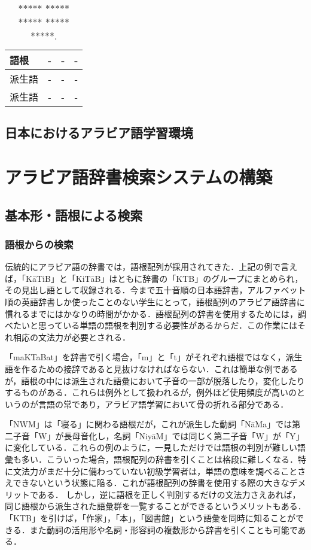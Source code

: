 \documentclass[technicalreport]{ieicej}
\begin{document}
\begin{table}[ht]
\begin{center}
\begin{tabular}{l|ccc}
   語根& - & -& -\\
  \hline
 派生語& - & -& -\\
  派生語 & - & - & -\\
\hline
\end{tabular}
\caption{***** ***** ***** ***** *****.}
\label{table:alignment}
\end{center}
\end{table}


\subsection{日本におけるアラビア語学習環境}

\section{アラビア語辞書検索システムの構築}
\subsection{基本形・語根による検索}
\subsubsection{語根からの検索}
伝統的にアラビア語の辞書では，語根配列が採用されてきた．上記の例で言えば，「KāTiB」と「KiTāB」はともに辞書の「KTB」のグループにまとめられ，その見出し語として収録される．今まで五十音順の日本語辞書，アルファベット順の英語辞書しか使ったことのない学生にとって，語根配列のアラビア語辞書に慣れるまでにはかなりの時間がかかる．語根配列の辞書を使用するためには，調べたいと思っている単語の語根を判別する必要性があるからだ．この作業にはそれ相応の文法力が必要とされる．

「maKTaBat」を辞書で引く場合，「m」と「t」がそれぞれ語根ではなく，派生語を作るための接辞であると見抜けなければならない．これは簡単な例であるが，語根の中には派生された語彙において子音の一部が脱落したり，変化したりするものがある．これらは例外として扱われるが，例外ほど使用頻度が高いのというのが言語の常であり，アラビア語学習において骨の折れる部分である．

「NWM」は「寝る」に関わる語根だが，これが派生した動詞「NāMa」では第二子音「W」が長母音化し，名詞「NiyāM」では同じく第二子音「W」が「Y」に変化している．これらの例のように，一見しただけでは語根の判別が難しい語彙も多い．こういった場合，語根配列の辞書を引くことは格段に難しくなる．特に文法力がまだ十分に備わっていない初級学習者は，単語の意味を調べることさえできないという状態に陥る．これが語根配列の辞書を使用する際の大きなデメリットである．
しかし，逆に語根を正しく判別するだけの文法力さえあれば，同じ語根から派生された語彙群を一覧することができるというメリットもある． 「KTB」を引けば，「作家」，「本」，「図書館」という語彙を同時に知ることができる．また動詞の活用形や名詞・形容詞の複数形から辞書を引くことも可能である．
\end{document}
